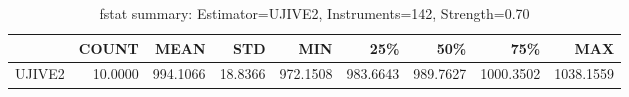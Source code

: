 \begin{table}[ht]
\centering
\caption{fstat summary: Estimator=UJIVE2, Instruments=142, Strength=0.70}
\begin{tabular}{lrrrrrrrr}
\toprule
 & COUNT & MEAN & STD & MIN & 25\% & 50\% & 75\% & MAX \\
\midrule
UJIVE2 & 10.0000 & 994.1066 & 18.8366 & 972.1508 & 983.6643 & 989.7627 & 1000.3502 & 1038.1559 \\
\bottomrule
\end{tabular}
\end{table}
